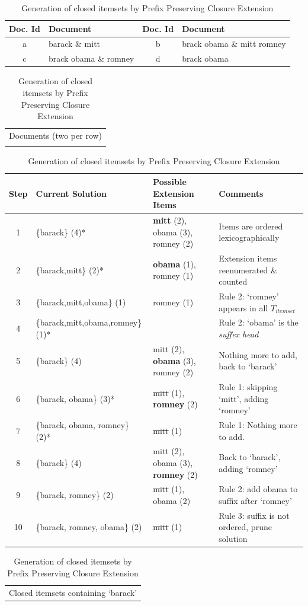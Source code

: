 \documentclass[letterpaper,12pt,titlepage,oneside,final]{book}
\begin{document}
\begin{table}
\centering
\begin{tabular}{|c|p{5cm}||c|p{5cm}|} \hline
Doc. Id & Document & Doc. Id & Document\\\hline
a& barack \& mitt & b & brack obama \& mitt romney  \\\hline
c& brack obama \& romney & d & brack obama  \\\hline
\end{tabular}
\begin{tabular}{c}
Documents (two per row)\\\\
\end{tabular}
\begin{tabular}{|c|p{4.5cm}|p{5cm}|p{6cm}|} \hline
Step&Current Solution&Possible Extension Items&Comments\\ \hline
1& \{barack\} (4)* & \textbf{mitt} (2), obama (3), romney (2) & Items are ordered lexicographically\\ \hline
2& \{barack,mitt\} (2)* & \textbf{obama} (1), romney (1) & Extension items reenumerated \& counted\\ \hline
3 & \{barack,mitt,obama\} (1) & romney (1)                       & Rule 2: `romney' appears in all $T_{itemset}$\\\hline
4 & \{barack,mitt,obama,romney\}(1)* & & Rule 2: `obama'  is the \emph{suffex head} \\\hline
5 & \{barack\} (4) & mitt (2), \textbf{obama} (3), romney (2) & Nothing more to add, back to `barack' \\\hline
6 & \{barack, obama\} (3)* & \sout{mitt} (1), \textbf{romney} (2) & Rule 1: skipping `mitt', adding `romney' \\\hline
7 & \{barack, obama, romney\} (2)* & \sout{mitt} (1) & Rule 1: Nothing more to add. \\\hline
8 & \{barack\} (4) & mitt (2), obama (3), \textbf{romney} (2) & Back to `barack', adding `romney' \\\hline
9 & \{barack, romney\} (2) &  \sout{mitt} (1), obama (2) & Rule 2: add obama to suffix after `romney' \\\hline
10 & \{barack, romney, obama\} (2) &  \sout{mitt} (1)  & Rule 3: suffix is not ordered, prune solution\\\hline

\end{tabular}
\begin{tabular}{c}
Closed itemsets containing `barack'
\end{tabular}
\caption{Generation of closed itemsets by Prefix Preserving Closure Extension}
\label{table:PPCExample}
\end{table}
\end{document}
